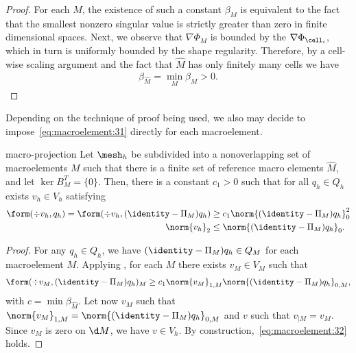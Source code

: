 \begin{proof}
  For each $M$, the existence of such a constant $\beta_{M}$ is
  equivalent to the fact that the smallest nonzero singular value is
  strictly greater than zero in finite dimensional spaces. Next, we
  observe that $\nabla \Phi_{M}$ is bounded by the
  $\nabla\Phi_{\cell_i}$, which in turn is uniformly bounded by the
  shape regularity. Therefore, by a cell-wise scaling argument and the
  fact that $\widehat M$ has only finitely many cells we have
  \begin{gather}
    \beta_{\widehat M} = \min_M \beta_M > 0.
  \end{gather}
\end{proof}

\begin{remark}
  Depending on the technique of proof being used, we also may decide
  to impose~\eqref{eq:macroelement:31} directly for each macroelement.
\end{remark}

\begin{Lemma}{macro-projection}
  Let $\mesh_h$ be subdivided into a nonoverlapping set of
  macroelements $M$ such that there is a finite set of reference macro
  elements $\widehat M$, and let $\ker{B^T_M} = \{0\}$. Then, there is
  a constant $c_1>0$ such that for all $q_h\in Q_h$ exists $v_h\in V_h$
  satisfying
  \begin{gather}
    \label{eq:macroelement:32}
    \begin{split}
      \form(\div v_h, q_h) = \form(\div v_h,{(\identity-\Pi_M)} q_h)
      &\ge c_1 \norm{(\identity-\Pi_M) q_h}_0^2\\
      \norm{v_h}_2 & \le \norm{(\identity-\Pi_M) q_h}_0.
    \end{split}
  \end{gather}
\end{Lemma}

\begin{proof}
  For any $q_h\in Q_h$, we have $(\identity-\Pi_M) q_h\in Q_M$ for each
  macroelement $M$. Applying , for each
  $M$ there exists $v_M\in V_M$ such that
  \begin{gather}
    \form(\div v_M, {(\identity-\Pi_M)} q_h)_M
    \ge c_1 \norm{v_M}_{1,M}\norm{(\identity-\Pi_M) q_h}_{0,M},
  \end{gather}
  with $c=\min \beta_{\widehat M}$. Let now $v_M$ such that
  $\norm{v_M}_{1,M} = \norm{(\identity-\Pi_M) q_h}_{0,M}$ and $v$ such that
  $v_{|M} = v_M$. Since $v_M$ is zero on $\d M$, we have $v\in
  V_h$. By construction,~\eqref{eq:macroelement:32} holds.
\end{proof}

